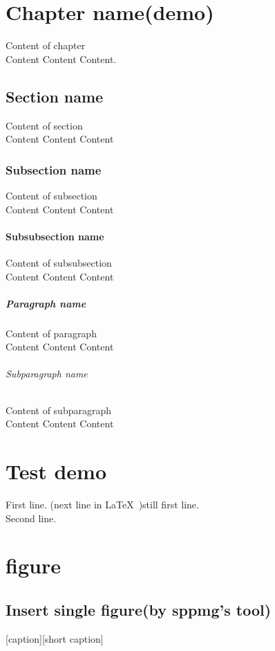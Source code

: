 \documentclass[class=NCU_thesis, crop=false]{standalone}
\begin{document}
\chapter{Chapter name(demo)}
Content of chapter \\
Content Content Content.

\section{Section name}
Content of section \\
Content Content Content
\subsection{Subsection name}
Content of subsection \\
Content Content Content

\subsubsection{Subsubsection name}
Content of subsubsection \\
Content Content Content

\paragraph{Paragraph name}
Content of paragraph \\
Content Content Content

\subparagraph{Subparagraph name}
Content of subparagraph \\
Content Content Content


\chapter{Test demo}
First line.
(next line in \LaTeX\ )still first line. \\
Second line.


\chapter{figure}
\section{Insert single figure(by sppmg's tool)}
[caption][short caption]
\end{document}
